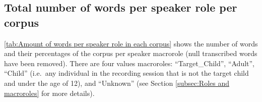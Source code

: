 \documentclass[a4paper, 11pt]{book}
\begin{document}
\subsection{Total number of words per speaker role per corpus}

\autoref{tab:Amount of words per speaker role in each corpus} shows the number of words and their percentages of the corpus per speaker macrorole (null transcribed words have been removed). There are four values macroroles: ``Target\_Child'', ``Adult'', ``Child'' (i.e.\ any individual in the recording session that is not the target child and under the age of 12), and ``Unknown'' (see Section \ref{subsec:Roles and macroroles} for more details).
\end{document}
